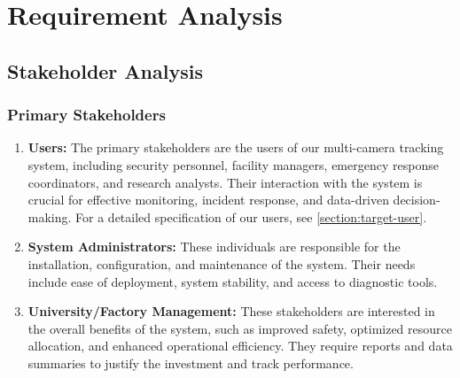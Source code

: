
\newcommand{\userstory}[4]{%
    \refstepcounter{nuserstory}
    \subsection{#1}
    \label{userstory:\thenuserstory}
    \hangindent=40pt
    \textbf{\textit{As a}} #2,\\
    \textbf{\textit{I want to}} #3,\\
    \textbf{\textit{so that}} #4.
}
\newenvironment{usecase}[1]
{
    \refstepcounter{nusecase}%
    \subsection{Use Case \thenusecase: #1}%
    \label{usecase:\thenusecase}%
}{}


\chapter{Requirement Analysis}
\label{chap:requirement-analysis}

\section{Stakeholder Analysis}
\label{section:stakeholder-analysis}

\subsection{Primary Stakeholders}
\label{subsection:primary-stakeholders}

\begin{enumerate}[leftmargin=80pt]
    \item \textbf{Users:} The primary stakeholders are the users of our multi-camera tracking system, including security personnel, facility managers, emergency response coordinators, and research analysts.  Their interaction with the system is crucial for effective monitoring, incident response, and data-driven decision-making.  For a detailed specification of our users, see \ref{section:target-user}.
    \item \textbf{System Administrators:}  These individuals are responsible for the installation, configuration, and maintenance of the system.  Their needs include ease of deployment, system stability, and access to diagnostic tools.
    \item \textbf{University/Factory Management:}  These stakeholders are interested in the overall benefits of the system, such as improved safety, optimized resource allocation, and enhanced operational efficiency.  They require reports and data summaries to justify the investment and track performance.
\end{enumerate}

